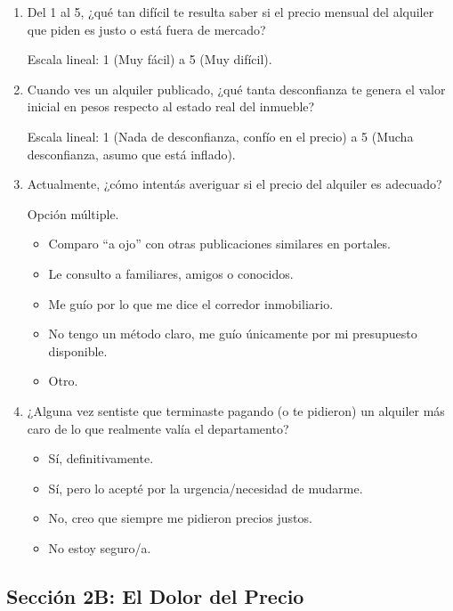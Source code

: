 \begin{enumerate}[label=\textbf{Q\arabic*:}, leftmargin=*, start=7]
\item Del 1 al 5, ¿qué tan difícil te resulta saber si el precio mensual del alquiler que piden es justo o está fuera de mercado?

Escala lineal: 1 (Muy fácil) a 5 (Muy difícil).

\item Cuando ves un alquiler publicado, ¿qué tanta desconfianza te genera el valor inicial en pesos respecto al estado real del inmueble?

Escala lineal: 1 (Nada de desconfianza, confío en el precio) a 5 (Mucha desconfianza, asumo que está inflado).

\item Actualmente, ¿cómo intentás averiguar si el precio del alquiler es adecuado?

Opción múltiple.

\begin{itemize}
\item Comparo ``a ojo'' con otras publicaciones similares en portales.
\item Le consulto a familiares, amigos o conocidos.
\item Me guío por lo que me dice el corredor inmobiliario.
\item No tengo un método claro, me guío únicamente por mi presupuesto disponible.
\item Otro.
\end{itemize}

\item ¿Alguna vez sentiste que terminaste pagando (o te pidieron) un alquiler más caro de lo que realmente valía el departamento?

\begin{itemize}
\item Sí, definitivamente.
\item Sí, pero lo acepté por la urgencia/necesidad de mudarme.
\item No, creo que siempre me pidieron precios justos.
\item No estoy seguro/a.
\end{itemize}
\end{enumerate}

\subsection{Sección 2B: El Dolor del Precio}


